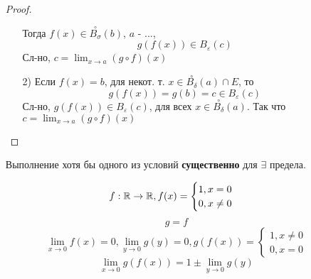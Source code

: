 \begin{itemize}
\begin{proof}
\begin{itemize}
        Тогда $f(x) \in \overset{\circ}{B_{\sigma}}(b)$, $a$ - ...,
        \[
        g(f(x)) \in B_{\varepsilon}(c)
        \]
        Сл-но, $c = \lim_{x\to a} (g \circ f)(x)$
      \item [2) ] Если $f(x) = b$, для некот. т. $x \in \overset{\circ}{B_{\delta}}(a) \cap E$, то
        \[
          g(f(x)) = g(b) = c \in B_{\varepsilon}(c)
        \]
        Сл-но, $g(f(x)) \in B_{\varepsilon}(c)$, для всех $x \in \overset{\circ}{B_{\delta}}(a)$. Так что $c = \lim_{x\to a} (g \circ f)(x)$
    \end{itemize}
    \end{proof}
    \begin{note}
    Выполнение хотя бы одного из условий \textbf{существенно} для $\exists$ предела.
    \end{note}
    \begin{example}
    \[
    f: \mathbb{R} \rightarrow \mathbb{R}, f(x) = 
    \begin{cases}
    1, x = 0 \\
    0, x \neq 0
    \end{cases}
    \]
    \[
    g = f
    \]
    \[
    \lim_{x\to 0} f(x) = 0, \lim_{y\to 0} g(y) = 0, g(f(x)) = 
    \begin{cases}
    1, x \neq 0 \\
    0, x = 0
    \end{cases}
    \]
    \[
    \lim_{x\to 0} g(f(x)) = 1 \pm \lim_{y\to 0} g(y)
    \]
    \end{example}
\end{itemize}

